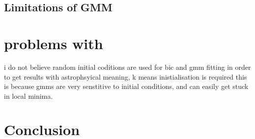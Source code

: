 \documentclass[a4paper,12pt]{article}
\begin{document}
\subsection{Limitations of GMM}






\section{problems with \citet{zhang2024existencemetalpoordiscmilky}}

i do not believe random initial coditions are used for bic and gmm fitting
in order to get results with astrophsyical meaning, k means inistialisation is required
this is because gmms are very senstitive to initial conditions, and can easily get stuck in local minima.


\section{Conclusion}



\newpage


\end{document}
